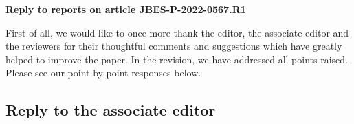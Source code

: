 \documentclass[a4paper,12pt]{article}
\begin{document}
\begin{center}
\underline{\Large\textbf{{Reply to reports on article JBES-P-2022-0567.R1}}}\end{center}
\vspace{10pt}


First of all, we would like to once more thank the editor, the associate editor and the reviewers for their thoughtful comments and suggestions which have greatly helped to improve the paper. In the revision, we have addressed all points raised. Please see our point-by-point responses below. 





\subsection*{Reply to the associate editor}
\end{document}
